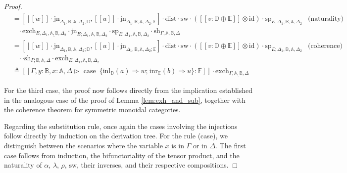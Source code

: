 \documentclass[10pt,a4paper]{amsart}
\theoremstyle{definition}
\theoremstyle{definition}
\theoremstyle{definition}
\theoremstyle{definition}
\theoremstyle{definition}
\theoremstyle{definition}
\begin{document}
\begin{proof}
\begin{align*}
  & = [[\![ w ]\!] \cdot \text{jn}_{\Delta_{1} ,\mathbb{B},\mathbb{A},  \Delta_{2};\mathbb{D}},  [\![u ]\!] \cdot \text{jn}_{\Delta_{1} ,\mathbb{B},\mathbb{A},  \Delta_{2};\mathbb{E}}] \cdot \text{dist} \cdot \text{sw} \cdot ([\![  v : \mathbb{D} \oplus \mathbb{E}  ]\!] \otimes \text{id}) \cdot \text{sp}_{E;\Delta_{1}, \mathbb{B}, \mathbb{A}, \Delta_{2}} & {\text{(naturality)}} \\
  & \hspace{10pt}  \cdot  \text{exch}_{E, \Delta_{1},\underline{\mathbb{A},\mathbb{B}},  \Delta_{2}} \cdot  \text{jn}_{E ;\Delta_{1},\mathbb{A},\mathbb{B},  \Delta_{2}}   \cdot\text{sp}_{E; \Delta_{1},\mathbb{A},\mathbb{B},  \Delta_{2}} \cdot \text{sh}_{\Gamma,\mathbb{A}, \mathbb{B},\Delta} \\
  & = [[\![ w ]\!] \cdot \text{jn}_{\Delta_{1} ,\mathbb{B},\mathbb{A},  \Delta_{2};\mathbb{D}},  [\![u ]\!] \cdot \text{jn}_{\Delta_{1} ,\mathbb{B},\mathbb{A},  \Delta_{2};\mathbb{E}}] \cdot \text{dist} \cdot \text{sw} \cdot ([\![  v : \mathbb{D} \oplus \mathbb{E}  ]\!] \otimes \text{id}) \cdot \text{sp}_{E; \Delta_{1}, \mathbb{B},\mathbb{A},  \Delta_{2}} & {\text{(coherence)}} \\
  & \hspace{10pt} \cdot \cdot \text{sh}_{\Gamma; \mathbb{B},\mathbb{A}, \Delta} \cdot  \text{exch}_{E, \Delta_{1},\underline{\mathbb{A},\mathbb{B}},  \Delta_{2}} \\
  & \triangleq [\![\Gamma,y:\mathbb{B}, x:\mathbb{A}, \Delta \triangleright \text{ case }  \hspace{2pt}  \{\text{inl}_{\mathbb{D}} (a) \Rightarrow w ; \hspace{1pt} \text{inr}_{\mathbb{E}} (b) \Rightarrow u\}: \mathbb{F}]\!] \cdot \text{exch}_{\Gamma,\underline{\mathbb{A},  \mathbb{B}}, \Delta}
\end{align*}

For the third case, the proof now follows directly from the implication established in the analogous case of the proof of Lemma \ref{lem:exh_and_sub}, together with the coherence theorem for symmetric monoidal categories.

Regarding the substitution rule, once again the cases involving the injections follow directly by induction on the derivation tree. For the rule (case), we distinguish between the scenarios where the variable $x$ is in $\Gamma$ or in $\Delta$. The first case follows from induction, the bifunctoriality of the tensor product, and the naturality of $\alpha$, $\lambda$, $\rho$, $\text{sw}$, their inverses, and their respective compositions.


\end{proof}
\end{document}
